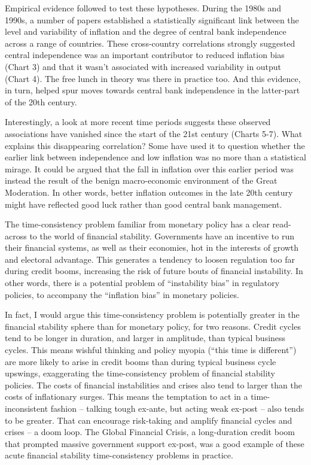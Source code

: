 \documentclass[
]{book}
\begin{document}
Empirical evidence followed to test these hypotheses. During the 1980s and 1990s, a number of papers established a statistically significant link between the level and variability of inflation and the degree of central bank independence across a range of countries. These cross-country correlations strongly suggested central independence was an important contributor to reduced inflation bias (Chart 3) and that it wasn't associated with increased variability in output (Chart 4). The free lunch in theory was there in practice too. And this evidence, in turn, helped spur moves towards central bank independence in the latter-part of the 20th century.

Interestingly, a look at more recent time periods suggests these observed associations have vanished since the start of the 21st century (Charts 5-7). What explains this disappearing correlation? Some have used it to question whether the earlier link between independence and low inflation was no more than a statistical mirage. It could be argued that the fall in inflation over this earlier period was instead the result of the benign macro-economic environment of the Great Moderation. In other words, better inflation outcomes in the late 20th century might have reflected good luck rather than good central bank management.

The time-consistency problem familiar from monetary policy has a clear read-across to the world of financial stability. Governments have an incentive to run their financial systems, as well as their economies, hot in the interests of growth and electoral advantage. This generates a tendency to loosen regulation too far during credit booms, increasing the risk of future bouts of financial instability. In other words, there is a potential problem of ``instability bias'' in regulatory policies, to accompany the ``inflation bias'' in monetary policies.

In fact, I would argue this time-consistency problem is potentially greater in the financial stability sphere than for monetary policy, for two reasons. Credit cycles tend to be longer in duration, and larger in amplitude, than typical business cycles. This means wishful thinking and policy myopia (``this time is different'') are more likely to arise in credit booms than during typical business cycle upswings, exaggerating the time-consistency problem of financial stability policies.
The costs of financial instabilities and crises also tend to larger than the costs of inflationary surges. This means the temptation to act in a time-inconsistent fashion -- talking tough ex-ante, but acting weak ex-post -- also tends to be greater. That can encourage risk-taking and amplify financial cycles and crises -- a doom loop. The Global Financial Crisis, a long-duration credit boom that prompted massive government support ex-post, was a good example of these acute financial stability time-consistency problems in practice.
\end{document}
